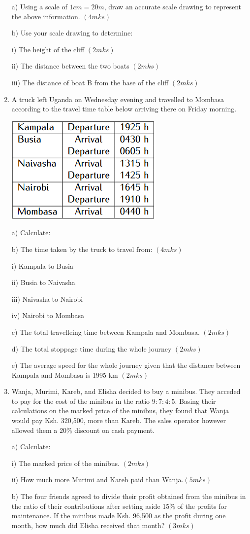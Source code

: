 \documentclass[
  a4paperpaper,
]{scrbook}
\begin{document}
\begin{tcolorbox}
\begin{enumerate}
  a) Using a scale of \(1 cm=20 m\), draw an accurate scale drawing to
  represent the above information. \((4mks)\)

  b) Use your scale drawing to determine:

  i) The height of the cliff \((2mks)\)

  ii) The distance between the two boats \((2mks)\)

  iii) The distance of boat B from the base of the cliff \((2mks)\)
\item
  A truck left Uganda on Wednesday evening and travelled to Mombasa
  according to the travel time table below arriving there on Friday
  morning.

  \includegraphics{figures/Md10_Q20.png}

  a) Calculate:

  b) The time taken by the truck to travel from: \((4mks)\)

  i) Kampala to Busia

  ii) Busia to Naivasha

  iii) Naivasha to Nairobi

  iv) Nairobi to Mombasa

  c) The total travelleing time between Kampala and Mombasa. \((2mks)\)

  d) The total stoppage time during the whole journey \((2mks)\)

  e) The average speed for the whole journey given that the distance
  between Kampala and Mombasa is 1995 km \((2mks)\)
\item
  Wanja, Murimi, Kareb, and Elisha decided to buy a minibus. They
  acceded to pay for the cost of the minibus in the ratio \(9:7:4:5\).
  Basing their calculations on the marked price of the minibus, they
  found that Wanja would pay Ksh. 320,500, more than Kareb. The sales
  operator however allowed them a \(20\%\) discount on cash payment.

  a) Calculate:

  i) The marked price of the minibus. \((2mks)\)

  ii) How much more Murimi and Kareb paid than Wanja.\((5mks)\)

  b) The four friends agreed to divide their profit obtained from the
  minibus in the ratio of their contributions after setting aside 15\%
  of the profits for maintenance. If the minibus made Ksh. 96,500 as the
  profit during one month, how much did Elisha received that month?
  \((3mks)\)
\end{enumerate}

\end{tcolorbox}
\end{document}
